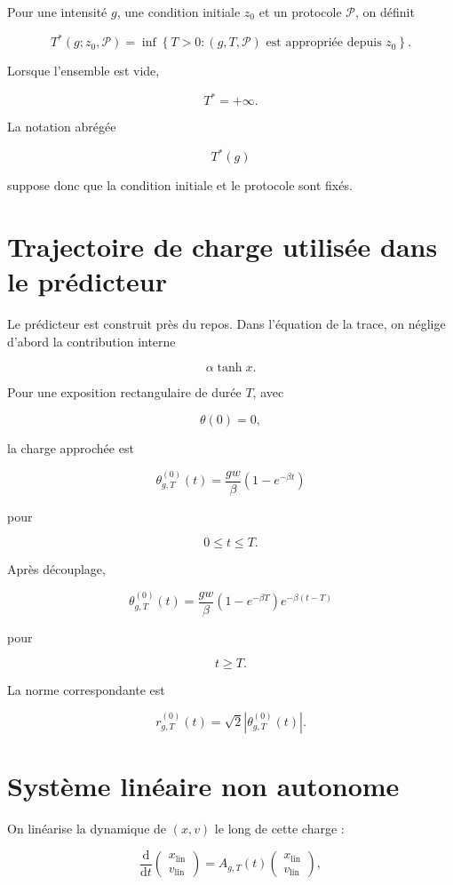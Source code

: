 Pour une intensité \(g\), une condition initiale \(z_0\) et un
protocole \(\mathcal P\), on définit

\[
\boxed{
T^\ast
(g;z_0,\mathcal P)
=
\inf
\left\{
T>0:
(g,T,\mathcal P)
\text{ est appropriée depuis }z_0
\right\}.
}
\]

Lorsque l'ensemble est vide,

\[
T^\ast=+\infty.
\]

La notation abrégée

\[
T^\ast(g)
\]

suppose donc que la condition initiale et le protocole sont fixés.

\section{Trajectoire de charge utilisée dans le prédicteur}
\label{annexe-resistance-charge-lineaire}

Le prédicteur est construit près du repos. Dans l'équation de la
trace, on néglige d'abord la contribution interne

\[
\alpha\tanh x.
\]

Pour une exposition rectangulaire de durée \(T\), avec

\[
\theta(0)=0,
\]

la charge approchée est

\[
\theta_{g,T}^{(0)}(t)
=
\frac{gw}{\beta}
\left(
1-e^{-\beta t}
\right)
\]

pour

\[
0\leq t\leq T.
\]

Après découplage,

\[
\theta_{g,T}^{(0)}(t)
=
\frac{gw}{\beta}
\left(
1-e^{-\beta T}
\right)
e^{-\beta(t-T)}
\]

pour

\[
t\geq T.
\]

La norme correspondante est

\[
r_{g,T}^{(0)}(t)
=
\sqrt2
\left|
\theta_{g,T}^{(0)}(t)
\right|.
\]

\section{Système linéaire non autonome}
\label{annexe-resistance-systeme-lineaire}

On linéarise la dynamique de \((x,v)\) le long de cette charge :

\[
\frac{\mathrm d}{\mathrm dt}
\begin{pmatrix}
x_{\mathrm{lin}}\\
v_{\mathrm{lin}}
\end{pmatrix}
=
A_{g,T}(t)
\begin{pmatrix}
x_{\mathrm{lin}}\\
v_{\mathrm{lin}}
\end{pmatrix},
\]

